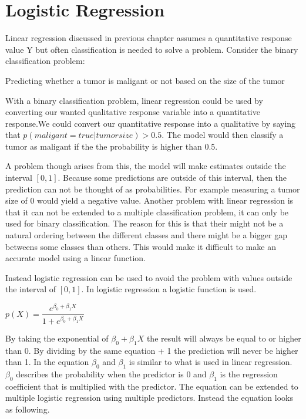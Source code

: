 \chapter{Logistic Regression}
\label{chp:logreg}
Linear regression discussed in previous chapter assumes a quantitative response value Y but often classification is needed to solve a problem. Consider the binary classification problem:
\begin{centering}
Predicting whether a tumor is maligant or not based on the size of the tumor
\end{centering}
With a binary classification problem, linear regression could be used by converting our wanted qualitative response variable into a quantitative response.We could convert our quantitative response into a qualitative by saying that $p(maligant = true | tumorsize) > 0.5$. The model would then classify a tumor as maligant if the the probability is higher than 0.5. 

A problem though arises from this, the model will make estimates outside the interval $[0,1]$. Because some predictions are outside of this interval, then the prediction can not be thought of as probabilities. For example measuring a tumor size of 0 would yield a negative value. Another problem with linear regression is that it can not be extended to a multiple classification problem, it can only be used for binary classification. The reason for this is that their might not be a natural ordering between the different classes and there might be a bigger gap betweens some classes than others. This would make it difficult to make an accurate model using a linear function.

Instead logistic regression can be used to avoid the problem with values outside the interval of $[0,1]$. In logistic regression a logistic function is used.

\begin{center}
	$p(X) = \dfrac{e^{\beta_0 + \beta_1 X}}{1 + e^{\beta_0 + \beta_1 X}}$ 
\end{center}

By taking the exponential of $\beta_0 + \beta_1 X$ the result will always be equal to or higher than 0. By dividing by the same equation + 1 the prediction will never be higher than 1. In the equation $\beta_0$ and $\beta_1$ is similar to what is used in linear regression. $\beta_0$ describes the probability when the predictor is 0 and $\beta_1$ is the regression coefficient that is multiplied  with the predictor. The equation can be extended to multiple logistic regression using multiple predictors. Instead the equation looks as following.

